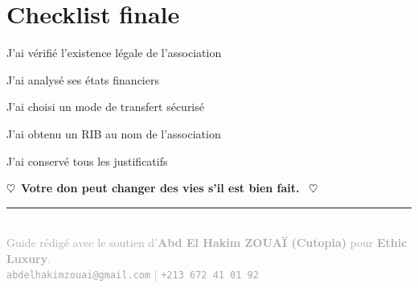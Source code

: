 \documentclass[12pt, a4paper]{article}
\newcommand{\heart}{\textcolor{cutopia}{\textbf{$\heartsuit$}}}
\begin{document}
\section*{Checklist finale}

\begin{tcolorbox}[colback=lightgray, colframe=darkgray]
    \begin{checklist}
        \item[$\square$] J'ai vérifié l'existence légale de l'association
        \item[$\square$] J'ai analysé ses états financiers
        \item[$\square$] J'ai choisi un mode de transfert sécurisé
        \item[$\square$] J'ai obtenu un RIB au nom de l'association
        \item[$\square$] J'ai conservé tous les justificatifs
    \end{checklist}
\end{tcolorbox}

\vspace{1cm}
\begin{center}
    \heart\ \textcolor{cutopia}{\textbf{Votre don peut changer des vies s'il est bien fait.}} \ \heart
\end{center}

\vspace{0.5cm}
\begin{center}
    \rule{0.6\textwidth}{0.3pt} \\[0.3cm]
    {\small \textcolor{darkgray}{Guide r\'edig\'e avec le soutien d'\textbf{Abd El Hakim ZOUA\"I (Cutopia)} pour \textbf{Ethic Luxury}.}} \\
    \small{\textcolor{darkgray}{\texttt{abdelhakimzouai@gmail.com} \quad | \quad \texttt{+213 672 41 01 92}}}
\end{center}
\end{document}
